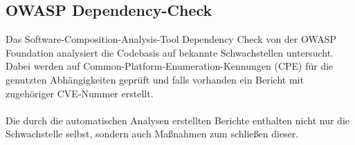\subsection{OWASP Dependency-Check} \label{sec:OWASP-Dependency-Check}
Das Software-Composition-Analysis-Tool Dependency Check von der OWASP Foundation analysiert die Codebasis auf bekannte Schwachstellen untersucht.
Dabei werden auf Common-Platform-Enumeration-Kennungen (CPE) für die genutzten Abhängigkeiten geprüft und falls vorhanden ein Bericht mit zugehöriger CVE-Nummer erstellt.
\\ \\
Die durch die automatischen Analysen erstellten Berichte enthalten nicht nur die Schwachstelle selbst, sondern auch Maßnahmen zum schließen dieser.